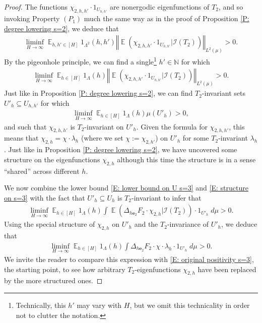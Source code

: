 \documentclass[10pt,a4paper]{amsart}
\newcommand{\CI}{{\mathcal I}}
\DeclareMathOperator*{\E}{\mathbb{E}}
\newcommand{\N}{{\mathbb N}}
\newcommand{\be}{{\mathbf{e}}}
\newcommand{\norm}[1]{\left\Vert #1\right\Vert}
\begin{document}
\begin{proof}
    The functions $\chi_{2,h,h'}\cdot 1_{U_{h,h'}}$ are nonergodic eigenfunctions of $T_2$, and so invoking Property $(P_1)$ much the same way as in the proof of Proposition \ref{P: degree lowering s=2}, we deduce that 
    \begin{align*}
                \liminf_{H\to\infty} \E_{h,h'\in[H]}1_{\Lambda^2}(h,h')
         \norm{\E(\chi_{2,h,h'}\cdot 1_{U_{h,h'}}|\CI(T_2))}_{L^2(\mu)} > 0.
    \end{align*}
    By the pigeonhole principle, we can find a single\footnote{Technically, this $h'$ may vary with $H$, but we omit this technicality in order not to clutter the notation.} $h'\in\N$ for which
    \begin{align*}
                \liminf_{H\to\infty} \E_{h\in[H]}1_{\Lambda}(h)
         \norm{\E(\chi_{2,h,h'}\cdot 1_{U_{h,h'}}|\CI(T_2))}_{L^2(\mu)} > 0.
    \end{align*}
    Just like in Proposition \ref{P: degree lowering s=2}, we can find $T_2$-invariant sets $U'_h\subseteq U_{h,h'}$ for which
    \begin{align}\label{E: structure on s=3}
        \liminf_{H\to\infty} \E_{h\in[H]}1_{\Lambda}(h)
         \mu(U'_h) > 0,
    \end{align}    
    and such that $\chi_{2,h,h'}$ is $T_2$-invariant on $U'_h$. Given the formula for $\chi_{2,h,h'}$, this means that $\chi_{2,h} = \chi\cdot\lambda_h$ (where we set $\chi:=\chi_{2,h'}$) on $U'_h$ for some $T_2$-invariant $\lambda_h$. Just like in Proposition \ref{P: degree lowering s=2}, we have uncovered some structure on the eigenfunctions $\chi_{2,h}$ although this time the structure is in a sense ``shared'' across different $h$. 

We now combine the lower bound \eqref{E: lower bound on U s=3} and \eqref{E: structure on s=3} with the fact that $U'_h\subseteq U_h$ is $T_2$-invariant to infer that
    \begin{align*}
         \liminf_{H\to\infty} \E_{h\in[H]}1_{\Lambda}(h)\int \E(\Delta_{h\be_2} F_2\cdot {\chi_{2,h}}|\CI(T_2))\cdot 1_{U'_h}\; d\mu > 0.
    \end{align*}
    Using the special structure of  $\chi_{2,h}$ on $U'_h$ and the $T_2$-invariance of $U'_h$, we deduce that
    \begin{align}\label{E: plugging special structure}
                 \liminf_{H\to\infty} \E_{h\in[H]}1_{\Lambda}(h)\int \Delta_{h\be_2} F_2\cdot \chi\cdot \lambda_h\cdot 1_{U'_h}\; d\mu > 0.
    \end{align}
    We invite the reader to compare this expression with \eqref{E: original positivity s=3}, the starting point, to see how arbitrary $T_2$-eigenfunctions $\chi_{2,h}$ have been replaced by the more structured ones. 


\end{proof}
\end{document}
